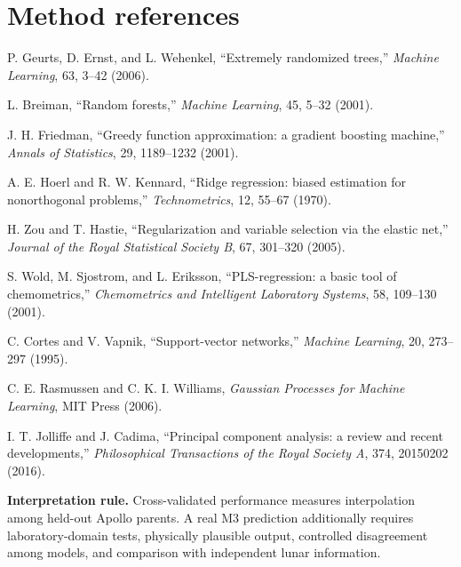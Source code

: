 \documentclass[11pt]{article}
\begin{document}
\section*{Method references}
\begin{enumerate}[label={[\arabic*]}]
 \item P. Geurts, D. Ernst, and L. Wehenkel, ``Extremely randomized trees,'' \emph{Machine Learning}, 63, 3--42 (2006).
 \item L. Breiman, ``Random forests,'' \emph{Machine Learning}, 45, 5--32 (2001).
 \item J. H. Friedman, ``Greedy function approximation: a gradient boosting machine,'' \emph{Annals of Statistics}, 29, 1189--1232 (2001).
 \item A. E. Hoerl and R. W. Kennard, ``Ridge regression: biased estimation for nonorthogonal problems,'' \emph{Technometrics}, 12, 55--67 (1970).
 \item H. Zou and T. Hastie, ``Regularization and variable selection via the elastic net,'' \emph{Journal of the Royal Statistical Society B}, 67, 301--320 (2005).
 \item S. Wold, M. Sjostrom, and L. Eriksson, ``PLS-regression: a basic tool of chemometrics,'' \emph{Chemometrics and Intelligent Laboratory Systems}, 58, 109--130 (2001).
 \item C. Cortes and V. Vapnik, ``Support-vector networks,'' \emph{Machine Learning}, 20, 273--297 (1995).
 \item C. E. Rasmussen and C. K. I. Williams, \emph{Gaussian Processes for Machine Learning}, MIT Press (2006).
 \item I. T. Jolliffe and J. Cadima, ``Principal component analysis: a review and recent developments,'' \emph{Philosophical Transactions of the Royal Society A}, 374, 20150202 (2016).
\end{enumerate}
\vfill
\noindent\colorbox{moonlight}{\parbox{0.96\textwidth}{\small
\textbf{Interpretation rule.} Cross-validated performance measures interpolation among held-out Apollo parents. A real M3 prediction additionally requires laboratory-domain tests, physically plausible output, controlled disagreement among models, and comparison with independent lunar information.}}
\end{document}
